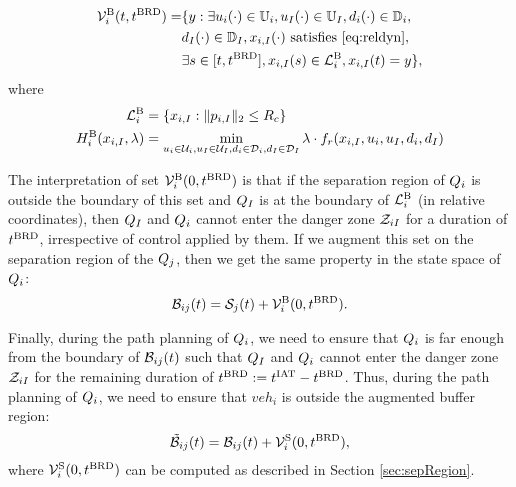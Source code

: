 \begin{equation} \label{eqn:buffBRS}
\begin{aligned}
\brs^{\text{B}}_{i}(t, \brd) = & \{y: \exists \ctrl_i(\cdot) \in \cfset_i, \ctrl_\intr(\cdot) \in \cfset_\intr, \dstb_i(\cdot) \in \dfset_i, \\
& \dstb_\intr(\cdot) \in \dfset_\intr, \state_{i, \intr}(\cdot) \text{ satisfies \eqref{eq:reldyn}},\\
& \exists s \in [t, \brd], \state_{i, \intr}(s) \in \targetset^{\text{B}}_{i}, \state_{i, \intr}(t) = y\},
\end{aligned}
\end{equation}
where 
\begin{equation}
\begin{aligned}
\mathcal{L}^{\text{B}}_{i} &= \{x_{i, I}: \|p_{i, I}\|_2 \le R_c\} \\
H^{\text{B}}_{i}(x_{i, I}, \lambda) &= \min_{u_i \in \mathcal{U}_i, u_I \in \mathcal{U}_I, d_i \in \mathcal{D}_i, d_I \in \mathcal{D}_I} \lambda \cdot f_r(x_{i, I}, u_i, u_I, d_i, d_I)
\end{aligned}
\end{equation}

The interpretation of set $\mathcal{V}^{\text{B}}_{i}(0, t^\text{BRD})$ is that if the separation region of $Q_i$ is outside the boundary of this set and $Q_{I}$ is at the boundary of $\mathcal{L}^{\text{B}}_{i}$ (in relative coordinates), then $Q_{I}$ and $Q_{i}$ cannot enter the danger zone $\mathcal{Z}_{iI}$ for a duration of $t^\text{BRD}$, irrespective of control applied by them. If we augment this set on the separation region of the $Q_j$, then we get the same property in the state space of $Q_i$:
\begin{equation} \label{eqn:buffRegion}
\buff_{ij}(t) = \sep_j(t) + \brs^{\text{B}}_{i}(0, \brd).
\end{equation} 

Finally, during the path planning of $Q_i$, we need to ensure that $Q_i$ is far enough from the boundary of $\mathcal{B}_{ij}(t)$ such that $Q_{I}$ and $Q_{i}$ cannot enter the danger zone $\mathcal{Z}_{iI}$ for the remaining duration of $t^\text{BRD} := t^\text{IAT} - t^\text{BRD}$. Thus, during the path planning of $Q_i$, we need to ensure that $veh_i$ is outside the augmented buffer region:
\begin{equation} \label{eqn:augbuffRegion1}
\tilde{\buff}_{ij}(t) = \buff_{ij}(t) + \brs^{\text{S}}_{i}(0, \trd),
\end{equation}
where $\mathcal{V}^{\text{S}}_{i}(0, t^\text{BRD})$ can be computed as described in Section \ref{sec:sepRegion}.

